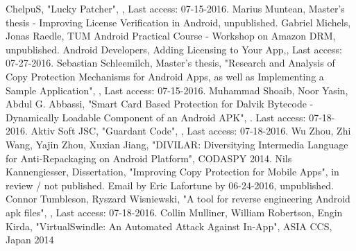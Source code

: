 \documentclass{sig-alternate}
\begin{document}
\begin{thebibliography}{99}
ChelpuS, "Lucky Patcher", , Last access: 07-15-2016.
 Marius Muntean, Master's thesis - Improving License Verification in Android, unpublished.
 Gabriel Michels, Jonas Raedle, TUM Android Practical Course - Workshop on Amazon DRM, unpublished.
 Android Developers, Adding Licensing to Your App,, Last access: 07-27-2016.
 Sebastian Schleemilch, Master's thesis, "Research and Analysis of Copy Protection Mechanisms for Android Apps, as well as Implementing a Sample Application", , Last access: 07-15-2016.
Muhammad Shoaib, Noor Yasin, Abdul G. Abbassi, "Smart Card Based Protection for Dalvik Bytecode - Dynamically Loadable Component of an Android APK", . Last access: 07-18-2016.
Aktiv Soft JSC, "Guardant Code", , Last access: 07-18-2016.
Wu Zhou, Zhi Wang, Yajin Zhou, Xuxian Jiang, "DIVILAR: Diversitying Intermedia Language for Anti-Repackaging on Android Platform", CODASPY 2014.
 Nils Kannengiesser, Dissertation, "Improving Copy Protection for Mobile Apps", in review / not published.
 Email by Eric Lafortune by 06-24-2016, unpublished.
Connor Tumbleson, Ryszard Wisniewski, "A tool for reverse engineering Android apk files", , Last access: 07-18-2016.
Collin Mulliner, William Robertson, Engin Kirda, "VirtualSwindle: An Automated Attack Against In-App", ASIA CCS, Japan 2014



\end{thebibliography}
\end{document}
